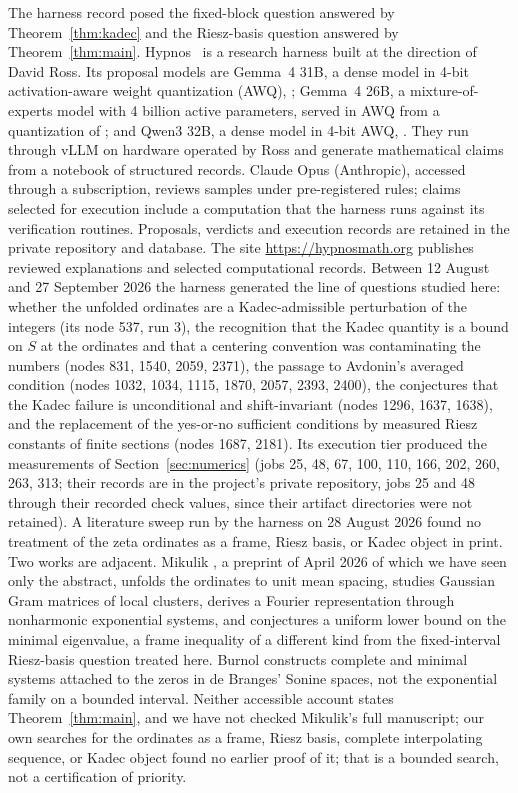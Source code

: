 \documentclass[11pt]{article}
\begin{document}
The harness record posed the fixed-block question answered by Theorem~\ref{thm:kadec} and the Riesz-basis question answered by Theorem~\ref{thm:main}. Hypnos~\cite{HypnosMethods} is a research harness built at the direction of David Ross. Its proposal models are Gemma~4 31B, a dense model in 4-bit activation-aware weight quantization (AWQ), ; Gemma~4 26B, a mixture-of-experts model with 4 billion active parameters, served in AWQ from a quantization of ; and Qwen3 32B, a dense model in 4-bit AWQ, . They run through vLLM on hardware operated by Ross and generate mathematical claims from a notebook of structured records. Claude Opus (Anthropic), accessed through a subscription, reviews samples under pre-registered rules; claims selected for execution include a computation that the harness runs against its verification routines. Proposals, verdicts and execution records are retained in the private repository and database. The site \url{https://hypnosmath.org} publishes reviewed explanations and selected computational records. Between 12 August and 27 September 2026 the harness generated the line of questions studied here: whether the unfolded ordinates are a Kadec-admissible perturbation of the integers (its node 537, run 3), the recognition that the Kadec quantity is a bound on $S$ at the ordinates and that a centering convention was contaminating the numbers (nodes 831, 1540, 2059, 2371), the passage to Avdonin's averaged condition (nodes 1032, 1034, 1115, 1870, 2057, 2393, 2400), the conjectures that the Kadec failure is unconditional and shift-invariant (nodes 1296, 1637, 1638), and the replacement of the yes-or-no sufficient conditions by measured Riesz constants of finite sections (nodes 1687, 2181). Its execution tier produced the measurements of Section~\ref{sec:numerics} (jobs 25, 48, 67, 100, 110, 166, 202, 260, 263, 313; their records are in the project's private repository, jobs 25 and 48 through their recorded check values, since their artifact directories were not retained). A literature sweep run by the harness on 28 August 2026 found no treatment of the zeta ordinates as a frame, Riesz basis, or Kadec object in print. Two works are adjacent. Mikulik \cite{Mikulik}, a preprint of April 2026 of which we have seen only the abstract, unfolds the ordinates to unit mean spacing, studies Gaussian Gram matrices of local clusters, derives a Fourier representation through nonharmonic exponential systems, and conjectures a uniform lower bound on the minimal eigenvalue, a frame inequality of a different kind from the fixed-interval Riesz-basis question treated here. Burnol \cite{Burnol04} constructs complete and minimal systems attached to the zeros in de Branges' Sonine spaces, not the exponential family on a bounded interval. Neither accessible account states Theorem~\ref{thm:main}, and we have not checked Mikulik's full manuscript; our own searches for the ordinates as a frame, Riesz basis, complete interpolating sequence, or Kadec object found no earlier proof of it; that is a bounded search, not a certification of priority.
\end{document}
